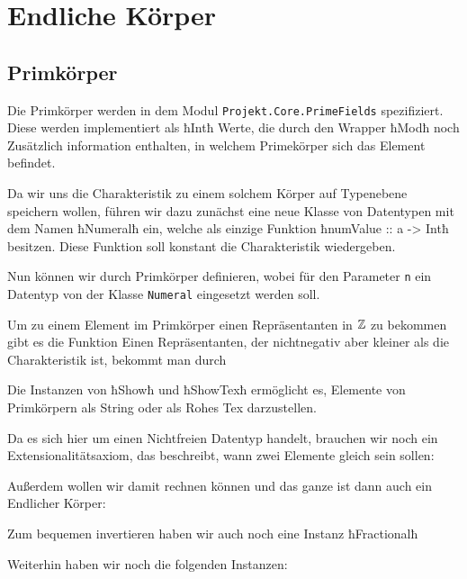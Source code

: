 \section{Endliche Körper}
\subsection{Primkörper}
Die Primkörper werden in dem Modul \texttt{Projekt.Core.PrimeFields}
spezifiziert. Diese werden implementiert als ħIntħ Werte, die durch den Wrapper
ħModħ noch Zusätzlich information enthalten, in welchem Primekörper sich das
Element befindet.

Da wir uns die Charakteristik zu einem solchem Körper auf Typenebene speichern
wollen, führen wir dazu zunächst eine neue Klasse von Datentypen mit dem Namen
ħNumeralħ ein, welche als einzige Funktion 
ħnumValue :: a -> Intħ besitzen.
Diese Funktion soll konstant die Charakteristik wiedergeben.

Nun können wir durch
Primkörper definieren, wobei für den Parameter \texttt{n} ein
Datentyp von der Klasse \texttt{Numeral} eingesetzt werden soll.

Um zu einem Element im Primkörper einen Repräsentanten in $\mathbb{Z}$ zu bekommen gibt
es die Funktion
Einen Repräsentanten, der nichtnegativ aber kleiner als die Charakteristik ist,
bekommt man durch

Die Instanzen von ħShowħ und ħShowTexħ ermöglicht es, Elemente von Primkörpern
als String oder als Rohes Tex darzustellen.

Da es sich hier um einen Nichtfreien Datentyp handelt, brauchen wir noch ein
Extensionalitätsaxiom, das beschreibt, wann zwei Elemente gleich sein sollen:

Außerdem wollen wir damit rechnen können und das ganze ist dann auch ein
Endlicher Körper:

Zum bequemen invertieren haben wir auch noch eine Instanz ħFractionalħ

Weiterhin haben wir noch die folgenden Instanzen:

